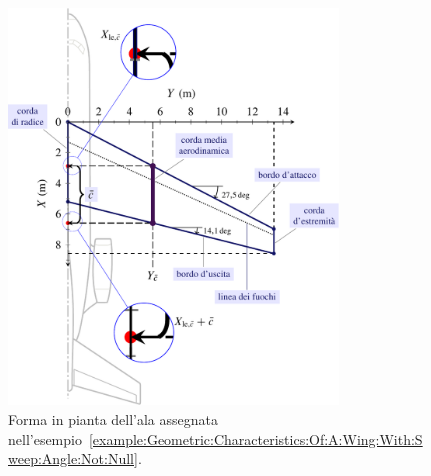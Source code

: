 \documentclass[[12pt,twoside]{book}
\begin{document}
\begin{figure}[t]%
\centering
   \includegraphics[width=0.78\textwidth]{Chapter_2/geometric_characteristics_of_a_wing_with_arrow_not_null/wing_planform_basic_1_drawing.pdf}%
  \caption{
           Forma in pianta dell'ala assegnata nell'esempio~\ref{example:Geometric:Characteristics:Of:A:Wing:With:Sweep:Angle:Not:Null}.}
\label{fig:Wing:Planform:Results:A}%
\end{figure}
%

%
\end{document}
